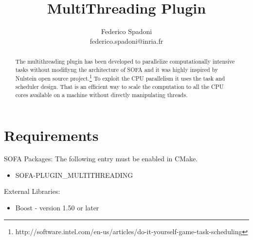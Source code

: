 \documentclass{article}
\begin{document}
\raggedright


  


\title{MultiThreading Plugin}
\author{Federico Spadoni\\[\baselineskip]federico.spadoni@inria.fr}

\maketitle

\begin{abstract}

The multithreading plugin has been developed to parallelize computationally intensive tasks without modifiyng the architecture of SOFA and it was highly inspired by Nulstein open source project.\footnote{http://software.intel.com/en-us/articles/do-it-yourself-game-task-scheduling}
To exploit the CPU parallelism it uses the task and scheduler design.
That is an efficient way to scale the computation to all the CPU cores available on
a machine without directly manipulating threads.


\end{abstract}



\section{Requirements}

SOFA Packages:
The following entry must be enabled in CMake.
\begin{itemize}
\item SOFA-PLUGIN\_MULTITHREADING
\end{itemize}

External Libraries:
\begin{itemize}
\item Boost - version 1.50 or later
\end{itemize}
\end{document}
